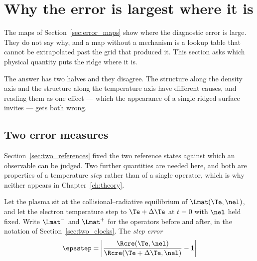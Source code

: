 %
%

\section{Why the error is largest where it is}
\label{sec:mechanism}

The maps of Section~\ref{sec:error_maps} show where the diagnostic error is
large. They do not say why, and a map without a mechanism is a lookup table
that cannot be extrapolated past the grid that produced it. This section asks
which physical quantity puts the ridge where it is.

The answer has two halves and they disagree. The structure along the density
axis and the structure along the temperature axis have different causes, and
reading them as one effect --- which the appearance of a single ridged surface
invites --- gets both wrong.

\subsection{Two error measures}
\label{sec:eps_definitions}

Section~\ref{sec:two_references} fixed the two reference states against which an
observable can be judged. Two further quantities are needed here, and both are
properties of a temperature \emph{step} rather than of a single operator, which
is why neither appears in Chapter~\ref{ch:theory}.

Let the plasma sit at the collisional--radiative equilibrium of
$\Lmat(\Te,\nel)$, and let the electron temperature step to $\Te+\Delta\Te$ at
$t=0$ with $\nel$ held fixed. Write $\Lmat^-$ and $\Lmat^+$ for the operators
before and after, in the notation of Section~\ref{sec:two_clocks}. The
\emph{step error}
\begin{equation}
  \epsstep = \left|\frac{\Rcre(\Te,\nel)}
                        {\Rcre(\Te+\Delta\Te,\nel)} - 1\right|
  \label{eq:eps_step_def}
\end{equation}

